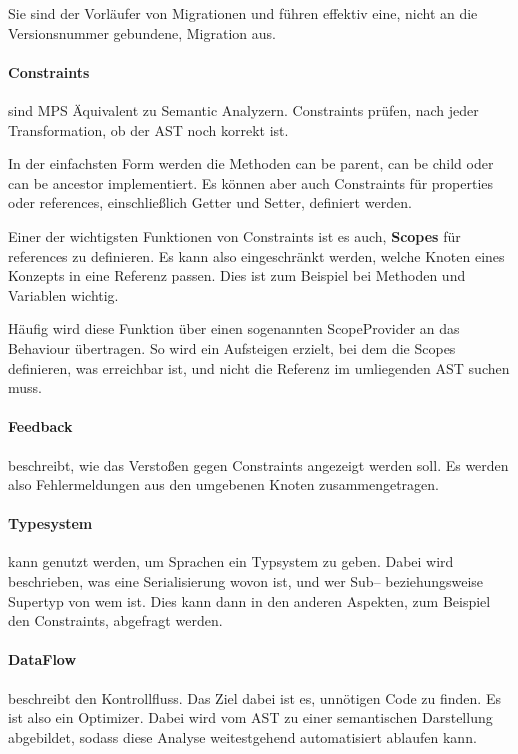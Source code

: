 Sie sind der Vorläufer von Migrationen und führen effektiv eine, nicht an die Versionsnummer gebundene, Migration aus.

\paragraph{Constraints} sind \ac{MPS} Äquivalent zu Semantic Analyzern.
Constraints prüfen, nach jeder Transformation, ob der \ac{AST} noch korrekt ist.

In der einfachsten Form werden die Methoden {\ttfamily can be parent}, {\ttfamily can be child} oder {\ttfamily can be ancestor} implementiert.
Es können aber auch Constraints für {\ttfamily properties} oder {\ttfamily references}, einschließlich Getter und Setter, definiert werden.

Einer der wichtigsten Funktionen von Constraints ist es auch, \textbf{Scopes} für {\ttfamily references} zu definieren.
Es kann also eingeschränkt werden, welche Knoten eines Konzepts in eine Referenz passen.
Dies ist zum Beispiel bei Methoden und Variablen wichtig.

Häufig wird diese Funktion über einen sogenannten {\ttfamily ScopeProvider} an das Behaviour übertragen.
So wird ein Aufsteigen erzielt, bei dem die Scopes definieren, was erreichbar ist, und nicht die Referenz im umliegenden \ac{AST} suchen muss.

\paragraph{Feedback} beschreibt, wie das Verstoßen gegen Constraints angezeigt werden soll.
Es werden also Fehlermeldungen aus den umgebenen Knoten zusammengetragen.

\paragraph{Typesystem} kann genutzt werden, um Sprachen ein Typsystem zu geben.
Dabei wird beschrieben, was eine Serialisierung wovon ist, und wer Sub-- beziehungsweise Supertyp von wem ist.
Dies kann dann in den anderen Aspekten, zum Beispiel den Constraints, abgefragt werden.

\paragraph{DataFlow} beschreibt den Kontrollfluss.
Das Ziel dabei ist es, unnötigen Code zu finden.
Es ist also ein Optimizer.
Dabei wird vom \ac{AST} zu einer semantischen Darstellung abgebildet, sodass diese Analyse weitestgehend automatisiert ablaufen kann.

